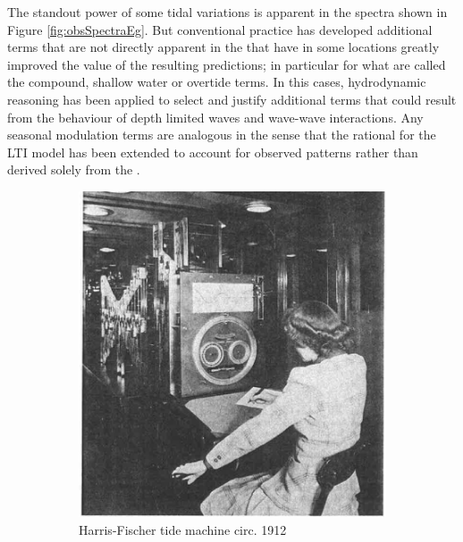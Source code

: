 The standout power of some tidal variations is apparent in the spectra shown in Figure \ref{fig:obsSpectraEg}. 
But conventional practice has developed additional terms that are not directly apparent in the \ATGP{} that have in some locations greatly improved the value of the resulting predictions; in particular for what are called the compound, shallow water or overtide terms. In this cases, hydrodynamic reasoning has been applied to select and justify additional terms that could result from the behaviour of depth limited waves and wave-wave interactions.
Any seasonal modulation terms are analogous in the sense that the rational for the LTI model has been extended to account for observed patterns rather than derived solely from the \ATGP{}.
\begin{figure}[H]
	\centering
	\begin{subfigure}[t]{\figwidthHalf}
	    \includegraphics[width=\textwidth]{figures/images/zetler_tidal_computer_lady_1921.png}
	    \caption{Harris-Fischer tide machine circ. 1912 }
    \end{subfigure}
    \hfill
    \begin{subfigure}[t]{\figwidthHalf}

\end{subfigure}
\end{figure}
